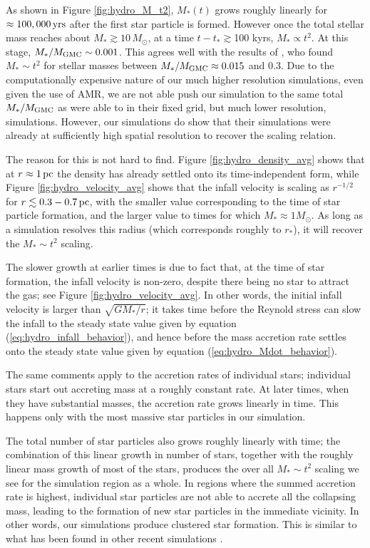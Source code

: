 \documentclass[../dissertation.tex]{subfiles}
\begin{document}
As shown in Figure \ref{fig:hydro_M_t2}, $M_*(t)$ grows roughly linearly for 
$\approx100,000\,\rm yrs$ after the first star particle is formed.  However 
once the total stellar mass reaches about $M_* \gtrsim 10\,M_{\odot}$, at a time 
$t-t_*\gtrsim $100 kyrs, $M_* \propto t^2$.  At this stage, 
$M_*/M_{\rm GMC} \sim 0.001$. This agrees well with the results of
\citet{2015ApJ...800...49L}, who found $M_*\sim t^2$ for stellar masses between 
$M_*/M_{\rm GMC} \approx 0.015$ and $0.3$.  Due to the computationally expensive 
nature of our much higher resolution simulations, even given the use of AMR,
we are not able push our simulation to the same total $M_*/M_{\rm GMC}$ 
as \citet{2015ApJ...800...49L} were able to in their fixed grid, but much lower resolution,
simulations. However, our simulations do show that their simulations were already at 
sufficiently high spatial resolution to recover the scaling relation. 

The reason for this is not hard to find. Figure \ref{fig:hydro_density_avg} shows 
that at $r\approx1\,\rm pc$ the density has already settled onto its time-independent form, while 
Figure \ref{fig:hydro_velocity_avg} shows that the infall velocity is scaling as $r^{-1/2}$ for 
$r\lesssim 0.3-0.7\,\rm pc$, with the smaller value corresponding to the time of star particle 
formation, and the larger value to times for which $M_*\approx 1M_\odot$. As long as
a simulation resolves this radius (which corresponds roughly to $r_*$), it will recover the
$M_*\sim t^2$ scaling. 

The slower growth at earlier times is due to fact that, at the time 
of star formation, the infall velocity is non-zero, despite there being no star to 
attract the gas; see Figure \ref{fig:hydro_velocity_avg}. In other words, the initial 
infall velocity is larger than $\sqrt{GM_*/r}$; it takes time before the Reynold stress can slow the infall to the steady state value given by equation 
(\ref{eq:hydro_infall_behavior}), and hence before the mass accretion rate settles onto the steady 
state value given by equation (\ref{eq:hydro_Mdot_behavior}).

The same comments apply to the accretion rates of individual stars; individual stars start
out accreting mass at a roughly constant rate. At later times, when they have substantial
masses, the accretion rate grows linearly in time. This happens only with the most massive 
star particles in our simulation. 

The total number of star particles also grows roughly
  linearly with time; the combination of this linear growth in number
  of stars, together with the roughly linear mass growth of most of
  the stars, produces the over all $M_*\sim t^2$ scaling we see for
  the simulation region as a whole. In regions where the summed
  accretion rate is highest, individual star particles are not able to
  accrete all the collapsing mass, leading to the formation of new
  star particles in the immediate vicinity. In other words, our
  simulations produce clustered star formation. This is similar to
  what has been found in other recent simulations
  \citep{2015ApJ...800...49L,2015ApJ...806...31G}.
\end{document}
